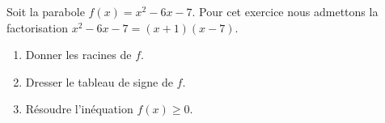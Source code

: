 
\begin{exercice}\label{exoPremiere-0098}

    Soit la parabole \( f(x)=x^2-6x-7\). Pour cet exercice nous admettons la factorisation \( x^2-6x-7=(x+1)(x-7)\). 
        \begin{enumerate}
            \item
                Donner les racines de \( f\).
            \item
                Dresser le tableau de signe de \( f\).
            \item
                Résoudre l'inéquation \( f(x)\geq 0\).
        \end{enumerate}

\end{exercice}
